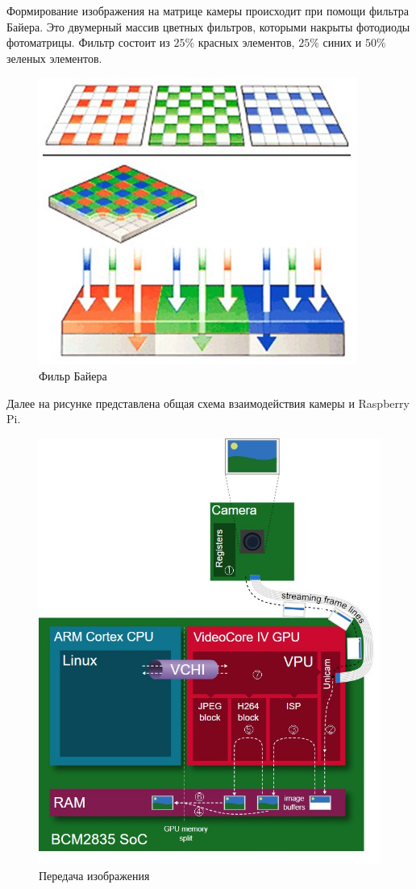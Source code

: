 \documentclass[a4paper,11pt]{article}
\begin{document}
\noindent Формирование изображения на матрице камеры происходит при помощи фильтра Байера. Это двумерный массив цветных фильтров, которыми накрыты фотодиоды фотоматрицы. Фильтр состоит из $25\%$ красных элементов, $25\%$ синих и $50\%$ зеленых элементов.
  \begin{figure}[h!]
    \begin{center}
      \includegraphics[scale=0.7]{images/рис_13.jpg}
    \caption{Фильр Байера}
    \end{center}
  \end{figure}
\newpage
\noindent Далее на рисунке представлена общая схема взаимодействия камеры и Raspberry Pi.
\begin{figure}[h!]
  \begin{center}
    \includegraphics[scale=0.7]{images/рис_14.jpg}
  \caption{Передача изображения}
  \end{center}
\end{figure}
\end{document}
